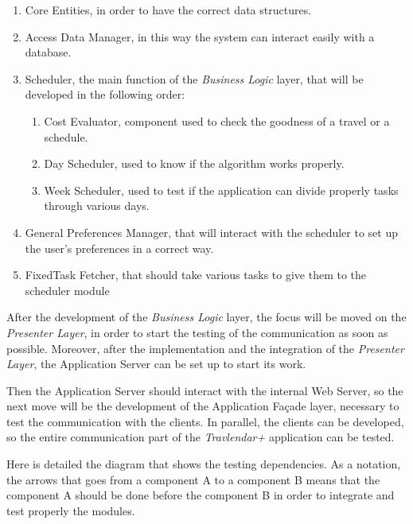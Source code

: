 \begin{enumerate}
    \item Core Entities, in order to have the correct data structures.
    \item Access Data Manager, in this way the system can interact easily with a database.
    \item Scheduler, the main function of the \emph{Business Logic} layer, that will be developed in the following order:
    \begin{enumerate}
        \item Cost Evaluator, component used to check the goodness of a travel or a schedule.
        \item Day Scheduler, used to know if the algorithm works properly.
        \item Week Scheduler, used to test if the application can divide properly tasks through various days.
    \end{enumerate}
    \item General Preferences Manager, that will interact with the scheduler to set up the user's preferences in a correct way.
    \item FixedTask Fetcher, that should take various tasks to give them to the scheduler module
\end{enumerate}

After the development of the \emph{Business Logic} layer, the focus will be moved on the \emph{Presenter Layer}, in order to start the testing of the communication as soon as possible. Moreover, after the implementation and the integration of the \emph{Presenter Layer}, the Application Server can be set up to start its work.

Then the Application Server should interact with the internal Web Server, so the next move will be the development of the Application Façade layer, necessary to test the communication with the clients.
In parallel, the clients can be developed, so the entire communication part of the \emph{Travlendar+} application can be tested.

Here is detailed the diagram that shows the testing dependencies. As a notation, the arrows that goes from a component A to a component B means that the component A should be done before the component B in order to integrate and test properly the modules.

